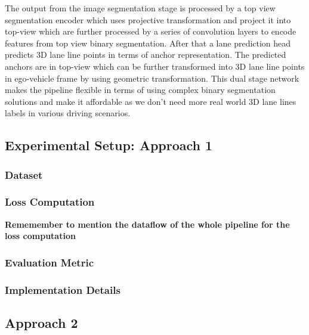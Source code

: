          The output from the image segmentation stage is processed by a top view segmentation encoder which uses projective transformation and project it into top-view which are further processed by a series of convolution layers to encode features from top view binary segmentation. After that a lane prediction head predicts 3D lane line points in terms of anchor representation. The predicted anchors are in top-view which can be further transformed into 3D lane line points in ego-vehicle frame by using geometric transformation. This dual stage network makes the pipeline flexible in terms of using complex binary segmentation solutions and make it affordable as we don't need more real world 3D lane lines labels in various driving scenarios.
        
        
        \subsection{Experimental Setup: Approach 1}
        
            \subsubsection{Dataset}
        
            \subsubsection{Loss Computation}
        
                \textbf{Rememember to mention the dataflow of the whole pipeline for the loss computation}
        
        
        
            \subsubsection{Evaluation Metric}
        
            \subsubsection{Implementation Details}
        
        \subsection{Approach 2}
        
